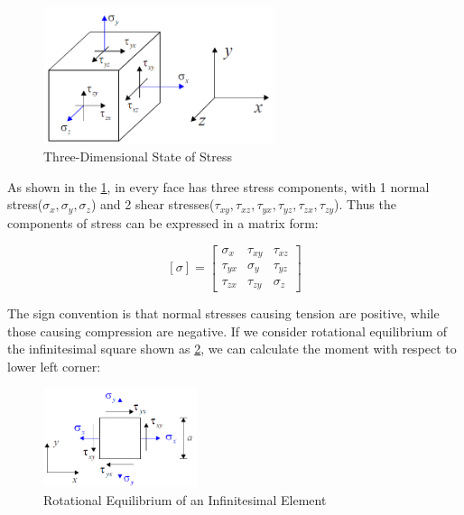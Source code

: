 \documentclass[en,hazy,cyan,8pt,normal]{elegantnote}
\numberwithin{equation}{section}
\begin{document}
    \begin{figure}[H]
      \centering
      \includegraphics[width=0.6\textwidth]{image/003.png}
      \caption{Three-Dimensional State of Stress}
      \label{fig:003}
    \end{figure}

    As shown in the \cref{fig:003}, in every face has three stress components, with 1 normal stress($\sigma_x, \sigma_y, \sigma_z$) and 2 shear stresses($\tau_{xy}, \tau_{xz}, \tau_{yx}, \tau_{yz}, \tau_{zx}, \tau_{zy}$). Thus the components of stress can be expressed in a matrix form:

    \begin{equation}\label{eq:003}
      [\sigma]=
      \begin{bmatrix}
        \sigma_x & \tau_{xy} & \tau_{xz}\\
        \tau_{yx} & \sigma_y & \tau_{yz}\\
        \tau_{zx} & \tau_{zy} & \sigma_z
      \end{bmatrix}
    \end{equation}

    The sign convention is that normal stresses causing tension are positive, while those causing compression are negative.
    If we consider rotational equilibrium of the infinitesimal square shown as \cref{fig:004}, we can calculate the moment with respect to lower left corner:

    \begin{figure}[H]
      \centering
      \includegraphics[width=0.4\textwidth]{image/004.png}
      \caption{Rotational Equilibrium of an Infinitesimal Element}
      \label{fig:004}
    \end{figure}
\end{document}

